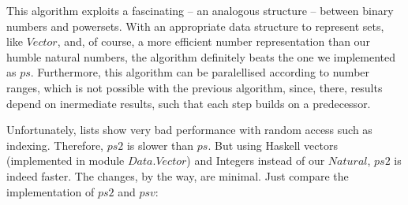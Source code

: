 \documentclass{scrreprt}
\newcommand{\Conid}[1]{\mathit{#1}}
\begin{document}
This algorithm exploits a fascinating
 -- an analogous structure --
between binary numbers and powersets.
With an appropriate data structure
to represent sets, like \ensuremath{\Conid{Vector}},
and, of course, a more efficient number representation
than our humble natural numbers,
the algorithm definitely beats the one
we implemented as $ps$.
Furthermore, this algorithm can be paralellised
according to number ranges, which is not possible
with the previous algorithm, since, there, results
depend on inermediate results, such that
each step builds on a predecessor.

Unfortunately, lists show very bad performance
with random access such as indexing.
Therefore, $ps2$ is slower than $ps$.
But using Haskell vectors (implemented in module $Data.Vector$)
and Integers instead of our $Natural$,
$ps2$ is indeed faster.
The changes, by the way, are minimal.
Just compare the implementation of $ps2$ and $psv$:
\end{document}
